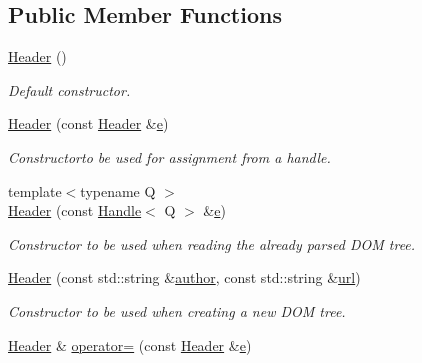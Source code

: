\subsection*{Public Member Functions}
\begin{DoxyCompactItemize}
\item 
\hyperlink{class_d_d4hep_1_1_geometry_1_1_header_a577016069dd076aa2127e4ee0c60eb7c}{Header} ()
\begin{DoxyCompactList}\small\item\em Default constructor. \end{DoxyCompactList}\item 
\hyperlink{class_d_d4hep_1_1_geometry_1_1_header_a613572c6f7759e5758865fd622fc54d7}{Header} (const \hyperlink{class_d_d4hep_1_1_geometry_1_1_header}{Header} \&\hyperlink{_volumes_8cpp_a8a9a1f93e9b09afccaec215310e64142}{e})
\begin{DoxyCompactList}\small\item\em Constructorto be used for assignment from a handle. \end{DoxyCompactList}\item 
{\footnotesize template$<$typename Q $>$ }\\\hyperlink{class_d_d4hep_1_1_geometry_1_1_header_aa4432291f46425a3fb41e26576d7e737}{Header} (const \hyperlink{class_d_d4hep_1_1_handle}{Handle}$<$ Q $>$ \&\hyperlink{_volumes_8cpp_a8a9a1f93e9b09afccaec215310e64142}{e})
\begin{DoxyCompactList}\small\item\em Constructor to be used when reading the already parsed D\+OM tree. \end{DoxyCompactList}\item 
\hyperlink{class_d_d4hep_1_1_geometry_1_1_header_a859f265a918b1b746037be9acc1f284f}{Header} (const std\+::string \&\hyperlink{class_d_d4hep_1_1_geometry_1_1_header_adfdf3966395650c581b177d1d238a398}{author}, const std\+::string \&\hyperlink{class_d_d4hep_1_1_geometry_1_1_header_a1c44ca4ccbe7e7861ac8e777f43469d3}{url})
\begin{DoxyCompactList}\small\item\em Constructor to be used when creating a new D\+OM tree. \end{DoxyCompactList}\item 
\hyperlink{class_d_d4hep_1_1_geometry_1_1_header}{Header} \& \hyperlink{class_d_d4hep_1_1_geometry_1_1_header_acc0a56dbbdcf868bccd82d1bc8216821}{operator=} (const \hyperlink{class_d_d4hep_1_1_geometry_1_1_header}{Header} \&\hyperlink{_volumes_8cpp_a8a9a1f93e9b09afccaec215310e64142}{e})

\end{DoxyCompactItemize}
